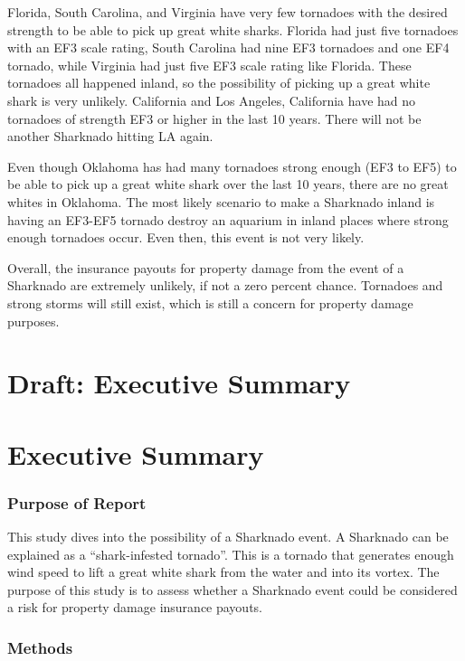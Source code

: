\documentclass[
  letterpaper,
  DIV=11,
  numbers=noendperiod]{scrreprt}
\begin{document}
Florida, South Carolina, and Virginia have very few tornadoes with the
desired strength to be able to pick up great white sharks. Florida had
just five tornadoes with an EF3 scale rating, South Carolina had nine
EF3 tornadoes and one EF4 tornado, while Virginia had just five EF3
scale rating like Florida. These tornadoes all happened inland, so the
possibility of picking up a great white shark is very unlikely.
California and Los Angeles, California have had no tornadoes of strength
EF3 or higher in the last 10 years. There will not be another Sharknado
hitting LA again.

Even though Oklahoma has had many tornadoes strong enough (EF3 to EF5)
to be able to pick up a great white shark over the last 10 years, there
are no great whites in Oklahoma. The most likely scenario to make a
Sharknado inland is having an EF3-EF5 tornado destroy an aquarium in
inland places where strong enough tornadoes occur. Even then, this event
is not very likely.

Overall, the insurance payouts for property damage from the event of a
Sharknado are extremely unlikely, if not a zero percent chance.
Tornadoes and strong storms will still exist, which is still a concern
for property damage purposes.

\chapter{Draft: Executive Summary}\label{draft-executive-summary}

\chapter{Executive Summary}\label{executive-summary-1}

\subsection{Purpose of Report}\label{purpose-of-report-1}

This study dives into the possibility of a Sharknado event. A Sharknado
can be explained as a ``shark-infested tornado''. This is a tornado that
generates enough wind speed to lift a great white shark from the water
and into its vortex. The purpose of this study is to assess whether a
Sharknado event could be considered a risk for property damage insurance
payouts.

\subsection{Methods}\label{methods-3}
\end{document}
